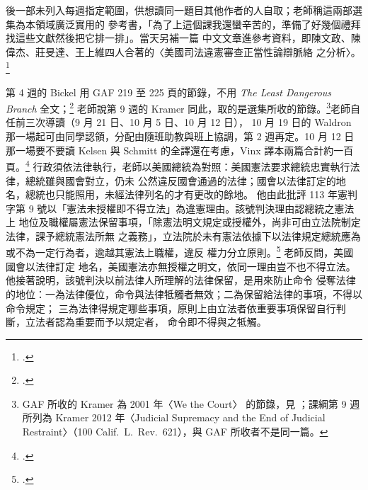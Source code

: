後一部未列入每週指定範圍，供想讀同一題目其他作者的人自取；老師稱這兩部選集為本領域廣泛實用的
參考書，「為了上這個課我還蠻辛苦的，準備了好幾個禮拜找這些文獻然後把它排一排」。當天另補一篇
中文文章進參考資料，即陳文政、陳偉杰、莊旻達、王上維四人合著的〈美國司法違憲審查正當性論辯脈絡
之分析〉。\footcite{chen2011}

第 4 週的 Bickel 用 GAF 219 至 225 頁的節錄，不用 \emph{The Least Dangerous Branch} 全文；\footcite{bickel2004}
老師說第 9 週的 Kramer 同此，取的是選集所收的節錄。\footnote{GAF 所收的 Kramer 為 2001 年〈We the Court〉
的節錄，見 \cite{kramer2001gaf}；課綱第 9 週所列為 Kramer 2012 年〈Judicial Supremacy and the End of
Judicial Restraint〉（100 Calif.\ L.\ Rev.\ 621），與 GAF 所收者不是同一篇。}老師自任前三次導讀（9 月 21 日、10 月 5 日、10 月 12 日），
10 月 19 日的 Waldron 那一場起可由同學認領，分配由隨班助教與班上協調，第 2 週再定。10 月 12 日
那一場要不要讀 Kelsen 與 Schmitt 的全譯還在考慮，Vinx 譯本兩篇合計約一百頁。\footcites[22--78]{kelsen2015}[79--124]{schmitt2015}
行政須依法律執行，老師以美國總統為對照：美國憲法要求總統忠實執行法律，總統雖與國會對立，仍未
公然違反國會通過的法律；國會以法律訂定的地名，總統也只能照用，未經法律列名的才有更改的餘地。
他由此批評 113 年憲判字第 9 號以「憲法未授權即不得立法」為違憲理由。該號判決理由認總統之憲法上
地位及職權屬憲法保留事項，「除憲法明文規定或授權外，尚非可由立法院制定法律，課予總統憲法所無
之義務」，立法院於未有憲法依據下以法律規定總統應為或不為一定行為者，逾越其憲法上職權，違反
權力分立原則。\footcite[理由第 81 段；另見第 91、116 段]{ccj113-9} 老師反問，美國國會以法律訂定
地名，美國憲法亦無授權之明文，依同一理由豈不也不得立法。他接著說明，該號判決以前法律人所理解的法律保留，是用來防止命令
侵奪法律的地位：一為法律優位，命令與法律牴觸者無效；二為保留給法律的事項，不得以命令規定；
三為法律得規定哪些事項，原則上由立法者依重要事項保留自行判斷，立法者認為重要而予以規定者，
命令即不得與之牴觸。
